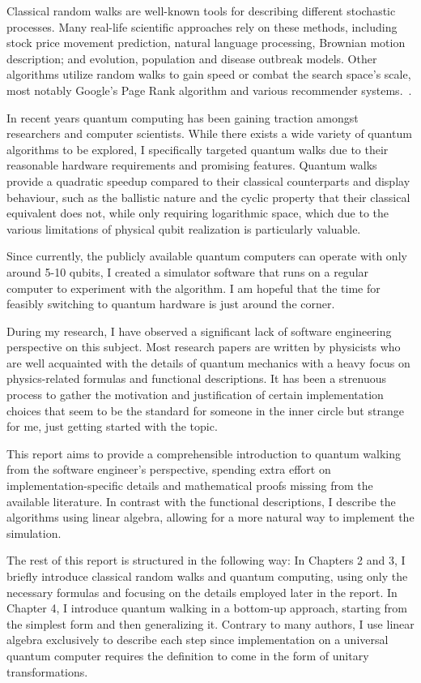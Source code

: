 Classical random walks are well-known tools for describing different stochastic processes. Many real-life scientific approaches rely on these methods, including stock price movement prediction, natural language processing, Brownian motion description; and evolution, population and disease outbreak models. Other algorithms utilize random walks to gain speed or combat the search space's scale, most notably Google's Page Rank algorithm and various recommender systems.~\cite{XiaReview}.

In recent years quantum computing has been gaining traction amongst researchers and computer scientists. While there exists a wide variety of quantum algorithms to be explored, I specifically targeted quantum walks due to their reasonable hardware requirements and promising features. Quantum walks provide a quadratic speedup compared to their classical counterparts and display behaviour, such as the ballistic nature and the cyclic property that their classical equivalent does not, while only requiring logarithmic space, which due to the various limitations of physical qubit realization is particularly valuable.~\cite{Portugal}

Since currently, the publicly available quantum computers can operate with only around 5-10 qubits, I created a simulator software that runs on a regular computer to experiment with the algorithm. I am hopeful that the time for feasibly switching to quantum hardware is just around the corner.

During my research, I have observed a significant lack of software engineering perspective on this subject. Most research papers are written by physicists who are well acquainted with the details of quantum mechanics with a heavy focus on physics-related formulas and functional descriptions. It has been a strenuous process to gather the motivation and justification of certain implementation choices that seem to be the standard for someone in the inner circle but strange for me, just getting started with the topic.

This report aims to provide a comprehensible introduction to quantum walking from the software engineer's perspective, spending extra effort on implementation-specific details and mathematical proofs missing from the available literature. In contrast with the functional descriptions, I describe the algorithms using linear algebra, allowing for a more natural way to implement the simulation.

The rest of this report is structured in the following way: In Chapters 2 and 3, I briefly introduce classical random walks and quantum computing, using only the necessary formulas and focusing on the details employed later in the report. In Chapter 4, I introduce quantum walking in a bottom-up approach, starting from the simplest form and then generalizing it. Contrary to many authors, I use linear algebra exclusively to describe each step since implementation on a universal quantum computer requires the definition to come in the form of unitary transformations.

